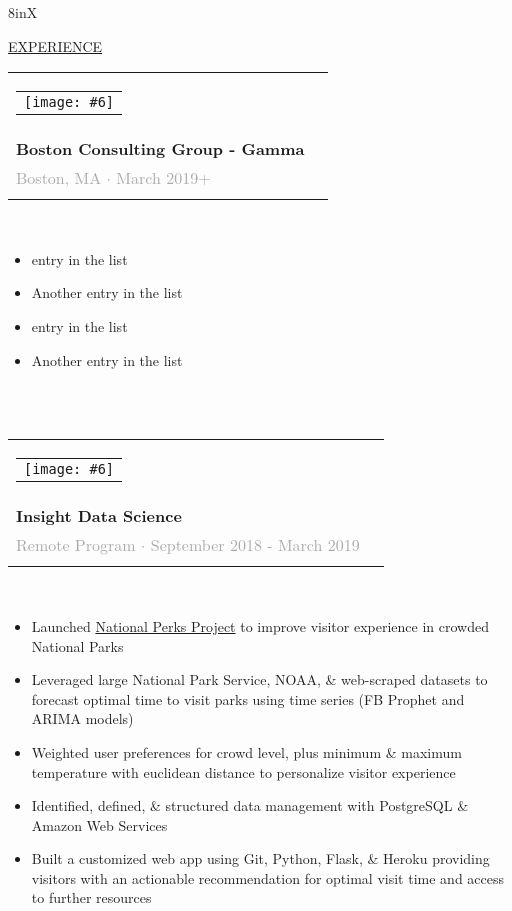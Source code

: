 \documentclass[fontsize=10pt]{scrlttr2}
\newcommand{\experienceboxsize}{8in}
\newcommand{\logosize}{0.6cm}
\newcommand{\logopad}{-0.6cm}
\newcommand{\experienceitem}[6]{
    {\begin{tabularx}{\experienceboxsize}{lX}
    	\begin{tabular}{c}
		{\texttt{[image: \#6]}} \hspace{\logopad}
	\end{tabular}
        & 
         \begin{tabular}{ll}
                \small\textbf{#1} \\
                \small\textbf{#2} \vspace{-0.1cm} \\
                \scriptsize\textcolor{darkgray}{#3 $\cdot$ #4} \\
         \end{tabular}
    \end{tabularx}} \\
    
    \vspace{-0.5cm}
    \begin{itemize}
    \footnotesize 
    \itemsep-0.5em 
	#5
    \end{itemize} \\
}
\begin{document}
\begin{tabularx}{\experienceboxsize}{X}

    \Large\underline{EXPERIENCE} \vspace{0.2cm}\\
    
    \experienceitem{Data Scientist}{Boston Consulting Group - Gamma}{Boston, MA}{March 2019+}{
            \item entry in the list
            \item Another entry in the list
            \item entry in the list
            \item Another entry in the list
    }{gamma} \\
    
    \vspace{-0.8cm}
    
    \experienceitem{Data Science Fellow}{Insight Data Science}{Remote Program}{September 2018 - March 2019}{
        \item Launched  \textcolor{special}{\href{http://www.nationalperks.fun}{National Perks Project}} to improve visitor experience in crowded National Parks
        		\vspace{1mm} 
        \item Leveraged large National Park Service, NOAA, \& web-scraped datasets to forecast optimal time to visit parks using time series (FB Prophet and ARIMA models)
        	        \vspace{1mm} 
        \item Weighted user preferences for crowd level, plus minimum \& maximum temperature with euclidean distance to personalize visitor experience
        		\vspace{1mm} 
        \item Identified, defined, \& structured data management with PostgreSQL \& Amazon Web Services
                \vspace{1mm} 
        \item Built a customized web app using Git, Python, Flask, \& Heroku providing visitors with an actionable recommendation for optimal visit time and access to further resources 
    }{insight} \\
    
        \vspace{-0.8cm}
    

\end{tabularx}
\end{document}
